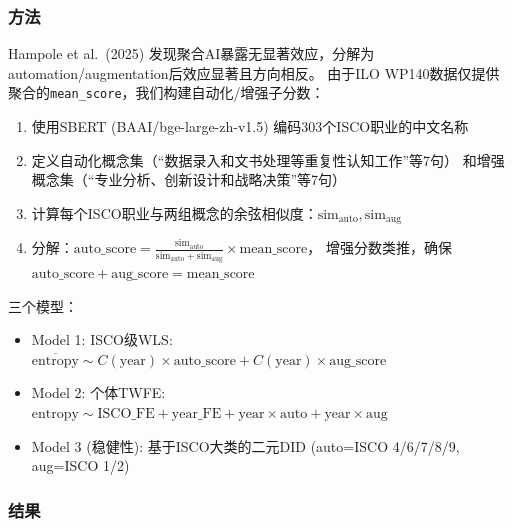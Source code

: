 \documentclass[12pt,a4paper]{ctexart}
\begin{document}
\subsubsection{方法}

Hampole et al.\ (2025) 发现聚合AI暴露无显著效应，分解为automation/augmentation后效应显著且方向相反。
由于ILO WP140数据仅提供聚合的\texttt{mean\_score}，我们构建自动化/增强子分数：

\begin{enumerate}
\item 使用SBERT (BAAI/bge-large-zh-v1.5) 编码303个ISCO职业的中文名称
\item 定义自动化概念集（``数据录入和文书处理等重复性认知工作''等7句）
      和增强概念集（``专业分析、创新设计和战略决策''等7句）
\item 计算每个ISCO职业与两组概念的余弦相似度：$\text{sim}_{\text{auto}}, \text{sim}_{\text{aug}}$
\item 分解：$\text{auto\_score} = \frac{\text{sim}_{\text{auto}}}{\text{sim}_{\text{auto}}+\text{sim}_{\text{aug}}} \times \text{mean\_score}$，
      增强分数类推，确保 $\text{auto\_score} + \text{aug\_score} = \text{mean\_score}$
\end{enumerate}

三个模型：
\begin{itemize}
\item Model 1: ISCO级WLS: $\overline{\text{entropy}} \sim C(\text{year}) \times \text{auto\_score} + C(\text{year}) \times \text{aug\_score}$
\item Model 2: 个体TWFE: $\text{entropy} \sim \text{ISCO\_FE} + \text{year\_FE} + \text{year} \times \text{auto} + \text{year} \times \text{aug}$
\item Model 3 (稳健性): 基于ISCO大类的二元DID (auto=ISCO 4/6/7/8/9, aug=ISCO 1/2)
\end{itemize}

\subsubsection{结果}
\end{document}
